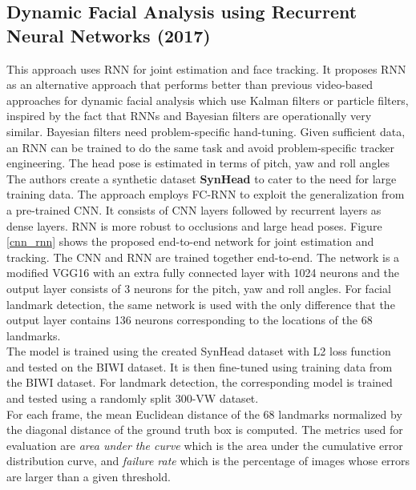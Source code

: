 \documentclass{llncs}
\begin{document}
\subsection{Dynamic Facial Analysis using Recurrent Neural Networks (2017) \textcolor{green}{\cite{dynamic_facial_analysis}}}

This approach uses RNN for joint estimation and face tracking. 
It proposes RNN as an alternative approach that performs better than previous video-based approaches for dynamic facial analysis which use Kalman filters or particle filters, inspired by the fact that RNNs and Bayesian filters are operationally very similar.
Bayesian filters need problem-specific hand-tuning. Given sufficient data, an RNN can be trained to do the same task and avoid problem-specific tracker engineering. The head pose is estimated in terms of pitch, yaw and roll angles
The authors create a synthetic dataset \textbf{SynHead} to cater to the need for large training data. The approach employs FC-RNN to exploit the generalization from a pre-trained CNN. It consists of CNN layers followed by recurrent layers as dense layers. RNN is more robust to occlusions and large head poses. Figure \textcolor{red}{\ref{cnn_rnn}} shows the proposed end-to-end network for joint estimation and tracking. The CNN and RNN are trained together end-to-end. The network is a modified VGG16 with an extra fully connected layer with 1024 neurons and the output layer consists of 3 neurons for the pitch, yaw and roll angles. For facial landmark detection, the same network is used with the only difference that the output layer contains 136 neurons corresponding to the locations of the 68 landmarks.\\

The model is trained using the created SynHead dataset with L2 loss function and tested on the BIWI dataset. It is then fine-tuned using training data from the BIWI dataset. For landmark detection, the corresponding model is trained and tested using a randomly split 300-VW dataset. \\

For each frame, the mean Euclidean distance of the 68 landmarks normalized by the diagonal distance of the ground truth box is computed. The metrics used for evaluation are \textit{area under the curve} which is the area under the cumulative error distribution curve, and \textit{failure rate} which is the percentage of images whose errors are larger than a given threshold.
\end{document}
